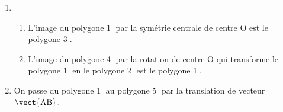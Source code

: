 
\medskip

%
%

\begin{enumerate}
\item ~

	\begin{enumerate}
		\item %
	L'image du polygone \textcircled{1} par la symétrie centrale de centre O est le polygone \textcircled{3}.
		\item %
L'image du polygone \textcircled{4} par la rotation de centre O qui transforme le polygone \textcircled{1} en le polygone \textcircled{2} est le polygone \textcircled{1}.
	\end{enumerate}
	
\item %

On passe du polygone \textcircled{1} au  polygone \textcircled{5} par la translation de vecteur $\vect{\text{AB}}$.


\end{enumerate}
